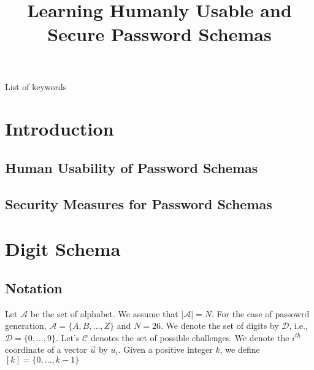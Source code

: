 \documentclass[anon,12pt]{colt2016}
\title[Learning Humanly Usable and Secure Password Schemas]{Learning Humanly Usable and Secure Password Schemas}
\begin{document}
 

\maketitle


\begin{abstract} 
	
\end{abstract}

\begin{keywords}
List of keywords
\end{keywords}



\section{Introduction}

\subsection{Human Usability of Password Schemas}

\subsection{Security Measures for Password Schemas}

\section{Digit Schema}

\subsection{Notation}

Let $\mathcal{A}$ be the set of alphabet. We assume that $|\mathcal{A}|=N$. For the case of passowrd generation, $\mathcal{A}=\{A,B,\ldots,Z\}$ and $N=26$. We denote the set of digits by $\mathcal{D}$, i.e., $\mathcal{D}=\{0,\ldots,9\}$. Let's $\mathcal{C}$ denotes the set of possible challenges. We denote the $i^{th}$ coordinate of a vector $\vec{u}$ by $u_i$. Given a positive integer $k$, we define $[k]=\{0,\ldots,k-1\}$
\end{document}
